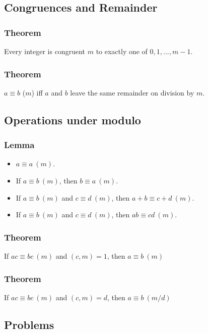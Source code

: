 \documentclass{article}
\begin{document}
\subsection{Congruences and Remainder}
\subsubsection{Theorem}
Every integer is congruent $m$ to exactly one of $0, 1, ... , m-1$.
\vspace{40px}

\subsubsection{Theorem}
$a \equiv b$ ($m$) iff $a$ and $b$ leave the same remainder on division by $m$.
\vspace{40px}

\subsection{Operations under modulo}
\subsubsection{Lemma}
\begin{itemize}
    \item $a \equiv a \ (m)$.
    \item If $a \equiv b \ (m)$, then $b \equiv a \ (m)$.
    \item If $a \equiv b \ (m)$ and $c \equiv d \ (m)$, then $a+b \equiv c+d \ (m)$.
    \item If $a \equiv b \ (m)$ and $c \equiv d \ (m)$, then $ab \equiv cd \ (m)$.
\end{itemize}
\vspace{60px}
\subsubsection{Theorem}
If $ac \equiv bc \ (m)$ and $(c,m)=1$, then $a \equiv b \ (m)$
\vspace{40px}
\subsubsection{Theorem}
If $ac \equiv bc \ (m)$ and $(c,m)=d$, then $a \equiv b \ (m/d)$
\vspace{40px}
\subsection{Problems}
\end{document}
